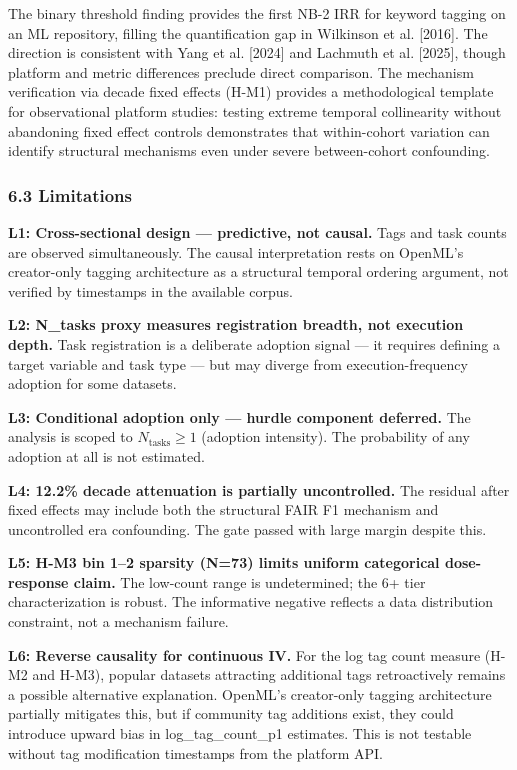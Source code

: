 The binary threshold finding provides the first NB-2 IRR for keyword tagging on an ML repository, filling the quantification gap in Wilkinson et al. [2016]. The direction is consistent with Yang et al. [2024] and Lachmuth et al. [2025], though platform and metric differences preclude direct comparison. The mechanism verification via decade fixed effects (H-M1) provides a methodological template for observational platform studies: testing extreme temporal collinearity without abandoning fixed effect controls demonstrates that within-cohort variation can identify structural mechanisms even under severe between-cohort confounding.

\subsubsection{6.3 Limitations}

\textbf{L1: Cross-sectional design --- predictive, not causal.} Tags and task counts are observed simultaneously. The causal interpretation rests on OpenML's creator-only tagging architecture \citep{Vanschoren2014OpenML} as a structural temporal ordering argument, not verified by timestamps in the available corpus.

\textbf{L2: N\_tasks proxy measures registration breadth, not execution depth.} Task registration is a deliberate adoption signal --- it requires defining a target variable and task type --- but may diverge from execution-frequency adoption for some datasets.

\textbf{L3: Conditional adoption only --- hurdle component deferred.} The analysis is scoped to $N_{\text{tasks}}\geq 1$ (adoption intensity). The probability of any adoption at all is not estimated.

\textbf{L4: 12.2\% decade attenuation is partially uncontrolled.} The residual after fixed effects may include both the structural FAIR F1 mechanism and uncontrolled era confounding. The gate passed with large margin despite this.

\textbf{L5: H-M3 bin 1--2 sparsity (N=73) limits uniform categorical dose-response claim.} The low-count range is undetermined; the 6+ tier characterization is robust. The informative negative reflects a data distribution constraint, not a mechanism failure.

\textbf{L6: Reverse causality for continuous IV.} For the log tag count measure (H-M2 and H-M3), popular datasets attracting additional tags retroactively remains a possible alternative explanation. OpenML's creator-only tagging architecture partially mitigates this, but if community tag additions exist, they could introduce upward bias in log\_tag\_count\_p1 estimates. This is not testable without tag modification timestamps from the platform API.

